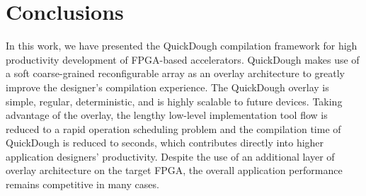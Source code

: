 



 
\section{Conclusions}\label{sec:conclusions}
In this work, we have presented the QuickDough compilation framework for high productivity
development of FPGA-based accelerators.  QuickDough makes use of a soft coarse-grained
reconfigurable array as an overlay architecture to greatly improve the designer's compilation
experience.  The QuickDough overlay is simple, regular, deterministic, and is highly scalable to
future devices.  Taking advantage of the overlay, the lengthy low-level implementation tool flow is
reduced to a rapid operation scheduling problem and the compilation time of QuickDough is reduced to
seconds, which contributes directly into higher application designers' productivity.
Despite the use of an additional layer of overlay architecture on the target FPGA, the overall
application performance remains competitive in many cases.

